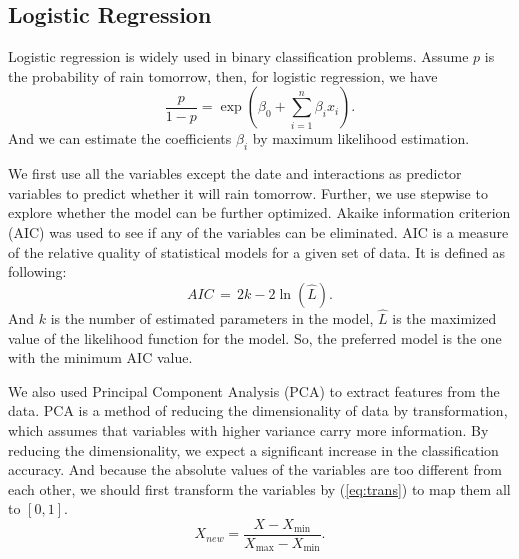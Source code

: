 \documentclass[11pt, a4paper, jou]{apa7}
\begin{document}
\subsection{Logistic Regression}
    Logistic regression\cite{Berkson1944} is widely used in binary classification problems. Assume $p$ is the probability of rain tomorrow, then, for logistic regression, we have
    \begin{equation}
        \frac{p}{1-p}=\exp\left(\beta_0+\sum_{i=1}^{n}\beta_i x_i\right). 
    \end{equation}
    And we can estimate the coefficients $\beta_i$ by maximum likelihood estimation. 

    We first use all the variables except the date and interactions as predictor variables to predict whether it will rain tomorrow. Further, we use stepwise to explore whether the model can be further optimized. Akaike information criterion (AIC)\cite{Akaike1974} was used to see if any of the variables can be eliminated. AIC is a measure of the relative quality of statistical models for a given set of data. It is defined as following: 
    \begin{equation}
        \label{eq:AIC}
        {AIC} \,=\,2k-2\ln({\hat {L}}). 
    \end{equation}
    And $k$ is the number of estimated parameters in the model, $\hat{L}$ is the maximized value of the likelihood function for the model. So, the preferred model is the one with the minimum AIC value. 

    We also used Principal Component Analysis (PCA)\cite{Pearson1901} to extract features from the data. PCA is a method of reducing the dimensionality of data by transformation, which assumes that variables with higher variance carry more information. By reducing the dimensionality, we expect a significant increase in the classification accuracy. And because the absolute values of the variables are too different from each other, we should first transform the variables by (\ref{eq:trans}) to map them all to $[0,1]$. 
    \begin{equation}
        \label{eq:trans}
        X_{new} = \frac{X - X_{\min}}{X_{\max}- X_{\min}}. 
    \end{equation}
\end{document}
